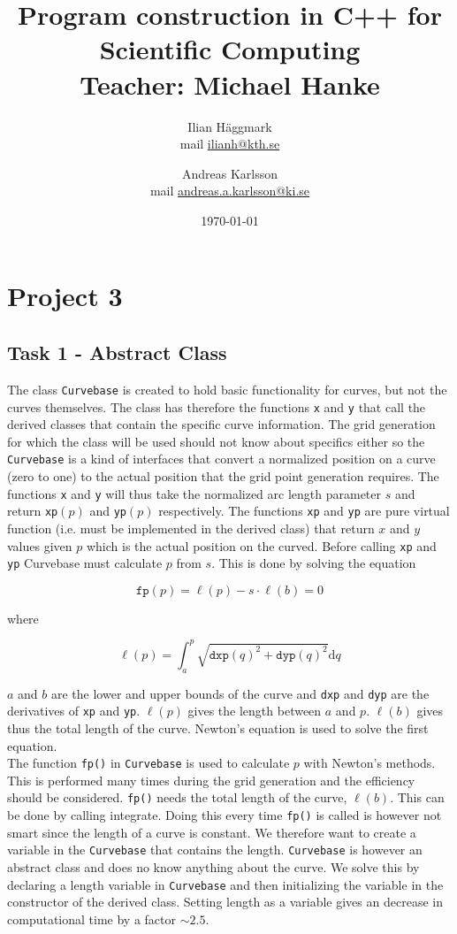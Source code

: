 \documentclass[paper=a4, fontsize=12pt]{article} %
\title{Program construction in C++ for Scientific Computing \\ Teacher: Michael Hanke}
\author{Ilian H{\"a}ggmark \\ mail \href{mailto:ilianh@kth.se}{ilianh@kth.se}
  \and Andreas Karlsson \\ mail \href{mailto:andreas.a.karlsson@ki.se}{andreas.a.karlsson@ki.se} }
\date{\normalsize\today} %
\begin{document}
\maketitle %

\section*{Project 3}
\subsection*{Task 1 - Abstract Class}

The class \texttt{Curvebase} is created to hold basic functionality for curves, but not the curves themselves. The class has therefore the functions \texttt{x} and \texttt{y} that call the derived classes that contain the specific curve information. The grid generation for which the class will be used should not know about specifics either so the \texttt{Curvebase} is a kind of interfaces that convert a normalized position on a curve (zero to one) to the actual position that the grid point generation requires. The functions \texttt{x} and \texttt{y} will thus take the normalized arc length parameter $s$ and return \texttt{xp}$(p)$ and \texttt{yp}$(p)$ respectively. The functions \texttt{xp} and \texttt{yp} are pure virtual function (i.e. must be implemented in the derived class) that return $x$ and $y$ values given $p$ which is the actual position on the curved. Before calling \texttt{xp} and \texttt{yp} Curvebase must calculate $p$ from $s$. This is done by solving the equation

$$ \texttt{fp}(p) = \ell(p)- s\cdot  \ell(b) = 0 $$

where

$$ \ell (p) = \int_a^p \sqrt{\texttt{dxp}(q)^2+\texttt{dyp}(q)^2} \textrm{d}q $$

$a$ and $b$ are the lower and upper bounds of the curve and \texttt{dxp} and \texttt{dyp} are the derivatives of \texttt{xp} and \texttt{yp}. $\ell (p)$ gives the length between $a$ and $p$. $\ell (b)$ gives thus the total length of the curve. Newton's equation is used to solve the first equation.\\

The function \texttt{fp()} in \texttt{Curvebase} is used to calculate $p$ with Newton's methods. This is performed many times during the grid generation and the efficiency should be considered. \texttt{fp()} needs the total length of the curve, $\ell (b)$. This can be done by calling integrate. Doing this every time \texttt{fp()} is called is however not smart since the length of a curve is constant. We therefore want to create a variable in the \texttt{Curvebase} that contains the length. \texttt{Curvebase} is however an abstract class and does no know anything about the curve. We solve this by declaring a length variable in \texttt{Curvebase} and then initializing the variable in the constructor of the derived class. Setting length as a variable gives an decrease in computational time by a factor $\sim 2.5$.\\
\end{document}
